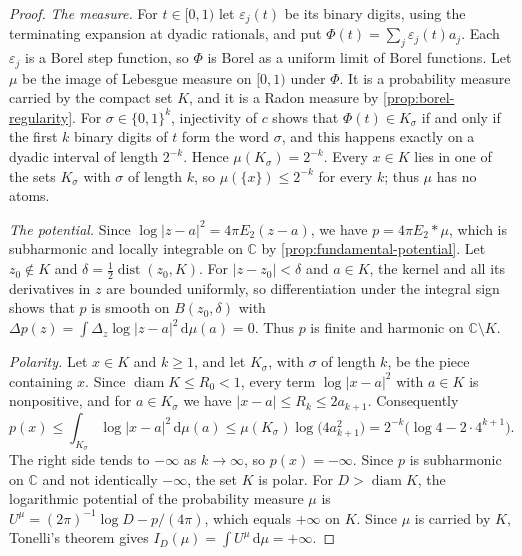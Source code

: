 \begin{proof}
\emph{The measure.} For $t\in[0,1)$ let $\varepsilon_j(t)$ be its binary digits, using the terminating expansion at dyadic rationals, and put $\Phi(t)=\sum_j\varepsilon_j(t)a_j$. Each $\varepsilon_j$ is a Borel step function, so $\Phi$ is Borel as a uniform limit of Borel functions. Let $\mu$ be the image of Lebesgue measure on $[0,1)$ under $\Phi$. It is a probability measure carried by the compact set $K$, and it is a Radon measure by \cref{prop:borel-regularity}. For $\sigma\in\{0,1\}^k$, injectivity of $c$ shows that $\Phi(t)\in K_\sigma$ if and only if the first $k$ binary digits of $t$ form the word $\sigma$, and this happens exactly on a dyadic interval of length $2^{-k}$. Hence $\mu(K_\sigma)=2^{-k}$. Every $x\in K$ lies in one of the sets $K_\sigma$ with $\sigma$ of length $k$, so $\mu(\{x\})\leq2^{-k}$ for every $k$; thus $\mu$ has no atoms.

\emph{The potential.} Since $\log|z-a|^2=4\pi E_2(z-a)$, we have $p=4\pi E_2*\mu$, which is subharmonic and locally integrable on $\mathbb C$ by \cref{prop:fundamental-potential}. Let $z_0\notin K$ and $\delta=\frac12\operatorname{dist}(z_0,K)$. For $|z-z_0|<\delta$ and $a\in K$, the kernel and all its derivatives in $z$ are bounded uniformly, so differentiation under the integral sign shows that $p$ is smooth on $B(z_0,\delta)$ with $\Delta p(z)=\int\Delta_z\log|z-a|^2\,\mathrm d\mu(a)=0$. Thus $p$ is finite and harmonic on $\mathbb C\setminus K$.

\emph{Polarity.} Let $x\in K$ and $k\geq1$, and let $K_\sigma$, with $\sigma$ of length $k$, be the piece containing $x$. Since $\operatorname{diam}K\leq R_0<1$, every term $\log|x-a|^2$ with $a\in K$ is nonpositive, and for $a\in K_\sigma$ we have $|x-a|\leq R_k\leq2a_{k+1}$. Consequently
\[
 p(x)\leq\int_{K_\sigma}\log|x-a|^2\,\mathrm d\mu(a)\leq\mu(K_\sigma)\log\bigl(4a_{k+1}^2\bigr)
       =2^{-k}\bigl(\log4-2\cdot4^{k+1}\bigr).
\]
The right side tends to $-\infty$ as $k\to\infty$, so $p(x)=-\infty$. Since $p$ is subharmonic on $\mathbb C$ and not identically $-\infty$, the set $K$ is polar. For $D>\operatorname{diam}K$, the logarithmic potential of the probability measure $\mu$ is $U^\mu=(2\pi)^{-1}\log D-p/(4\pi)$, which equals $+\infty$ on $K$. Since $\mu$ is carried by $K$, Tonelli's theorem gives $I_D(\mu)=\int U^\mu\,\mathrm d\mu=+\infty$.
\end{proof}

